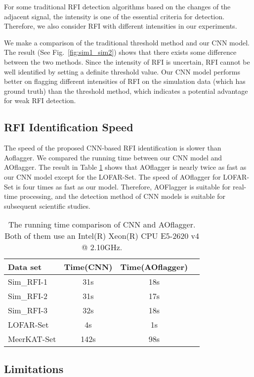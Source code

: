 \documentclass[usenatbib]{mnras}
\begin{document}
For some traditional RFI detection algorithms based on the changes of the adjacent signal, the intensity is one of the essential criteria for detection. Therefore, we also consider RFI with different intensities in our experiments.

We make a comparison of the traditional threshold method and our CNN model. The result (See Fig.~\ref{fig:sim1_sim2}) shows that there exists some difference between the two methods. Since the intensity of RFI is uncertain, RFI cannot be well identified by setting a definite threshold value. Our CNN model performs better on flagging different intensities of RFI on the simulation data (which has ground truth) than the threshold method, which indicates a potential advantage for weak RFI detection.

\subsection{RFI Identification Speed}
The speed of the proposed CNN-based RFI identification is slower than Aoflagger. We compared the running time between our CNN model and AOflagger. The result in Table \ref{tab:time} shows that AOflagger is nearly twice as fast as our CNN model except for the LOFAR-Set. The speed of AOflagger for LOFAR-Set is four times as fast as our model. Therefore, AOFlagger is suitable for real-time processing, and the detection method of CNN models is suitable for subsequent scientific studies.

\begin{table}
	\centering
	\caption{The running time comparison of CNN and AOflagger. Both of them use an Intel(R) Xeon(R) CPU E5-2620 v4 @ 2.10GHz.}
	\label{tab:time}
	\begin{tabular}{lccr} %
		\toprule
		Data set &  Time(CNN) & Time(AOflagger)\\
		\midrule
	    Sim\_RFI-1 & 31s & 18s \\
	    Sim\_RFI-2 & 31s & 17s\\
        Sim\_RFI-3 & 32s & 18s\\
		LOFAR-Set & 4s & 1s\\
		MeerKAT-Set & 142s & 98s\\
		\bottomrule
	\end{tabular}
	\label{tab:time}
\end{table}

\subsection{Limitations}
\end{document}
